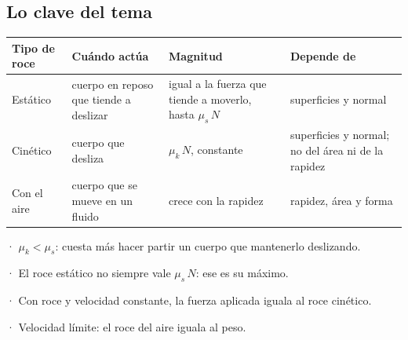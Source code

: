 \subsection{Lo clave del tema}
\begin{center}\small
\begin{tabularx}{\linewidth}{@{}>{\raggedright\arraybackslash\hsize=0.37\hsize}X>{\raggedright\arraybackslash\hsize=1.17\hsize}X>{\raggedright\arraybackslash\hsize=1.23\hsize}X>{\raggedright\arraybackslash\hsize=1.23\hsize}X@{}}
\toprule
\textbf{Tipo de roce} & \textbf{Cuándo actúa} & \textbf{Magnitud} & \textbf{Depende de} \\
\midrule
Estático & cuerpo en reposo que tiende a deslizar & igual a la fuerza que tiende a moverlo, hasta $\mu_s\,N$ & superficies y normal \\
Cinético & cuerpo que desliza & $\mu_k\,N$, constante & superficies y normal; no del área ni de la rapidez \\
Con el aire & cuerpo que se mueve en un fluido & crece con la rapidez & rapidez, área y forma \\
\bottomrule
\end{tabularx}
\end{center}
 
\begin{clave}[{Recuerda}] · $\mu_k < \mu_s$: cuesta más hacer partir un cuerpo que mantenerlo deslizando.\par · El roce estático no siempre vale $\mu_s\,N$: ese es su máximo.\par · Con roce y velocidad constante, la fuerza aplicada iguala al roce cinético.\par · Velocidad límite: el roce del aire iguala al peso.\end{clave}
 
